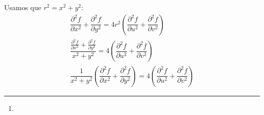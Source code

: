 \begin{enumerate}[label=\color{red}\textbf{\arabic*)}, leftmargin=*]
Usamos que $r^2=x^2+y^2$: \[  \begin{array}{c}
\dfrac{\partial^2 f}{\partial x^2}+\dfrac{\partial^2 f}{\partial y^2}=4r^2\left(\dfrac{\partial^2 f}{\partial u^2}+\dfrac{\partial^2 f}{\partial v^2}\right)\\
\dfrac{\frac{\partial^2 f}{\partial x^2}+\frac{\partial^2 f}{\partial y^2}}{x^2+y^2}=4\left(\dfrac{\partial^2 f}{\partial u^2}+\dfrac{\partial^2 f}{\partial v^2}\right)\\
\dfrac{1}{x^2+y^2}\left(\dfrac{\partial^2 f}{\partial x^2}+\dfrac{\partial^2 f}{\partial y^2}\right)=4\left(\dfrac{\partial^2 f}{\partial u^2}+\dfrac{\partial^2 f}{\partial v^2}\right)
\end{array}\]
\end{enumerate}

\begin{center}
\noindent\rule{0.5\textwidth}{0.5pt}
\end{center}

\begin{enumerate}[label=\color{red}\textbf{\arabic*)}, leftmargin=*]
	\item 
\end{enumerate}

